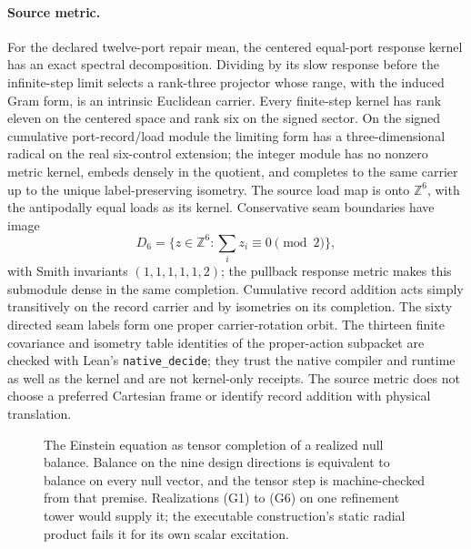 \documentclass[11pt]{article}
\begin{document}
\paragraph{Source metric.}
For the declared twelve-port repair mean, the centered equal-port response
kernel has an exact spectral decomposition. Dividing by its slow response
before the infinite-step limit selects a rank-three projector whose range,
with the induced Gram form, is an intrinsic Euclidean carrier. Every
finite-step kernel has rank eleven on the centered space and rank six on the
signed sector. On the signed cumulative port-record/load module the limiting
form has a three-dimensional radical on the real six-control extension; the
integer module has no nonzero metric kernel, embeds densely in the quotient,
and completes to the same carrier up to the unique label-preserving isometry.
The source load map is onto \(\mathbb Z^6\), with the antipodally equal loads
as its kernel. Conservative seam boundaries have image
\[
 D_6=\{z\in\mathbb Z^6:\textstyle\sum_i z_i\equiv0\pmod 2\},
\]
with Smith invariants \((1,1,1,1,1,2)\); the pullback response metric makes
this submodule dense in the same completion. Cumulative record addition acts
simply transitively on the record carrier and by isometries on its
completion. The sixty directed seam labels form one proper carrier-rotation
orbit. The thirteen finite covariance and isometry table identities of the
proper-action subpacket are checked with Lean's \texttt{native\_decide}; they
trust the native compiler and runtime as well as the kernel and are not
kernel-only receipts. The source metric does not choose a preferred Cartesian
frame or identify record addition with physical translation.

\begin{figure}[!htb]
\centering

\caption{The Einstein equation as tensor completion of a realized null balance. Balance on the nine design directions is equivalent to balance on every null vector, and the tensor step is machine-checked from that premise. Realizations (G1) to (G6) on one refinement tower would supply it; the executable construction's static radial product fails it for its own scalar excitation.}
\label{fig:einstein-chain}
\end{figure}
\end{document}
